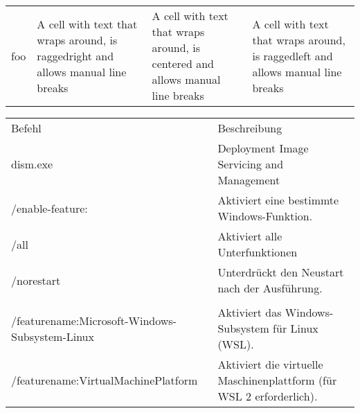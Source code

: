 \documentclass{article}
\begin{document}
\begin{tabular}{| c | L{3cm} | C{3cm} | R{3cm} |}
foo &
A cell with text that wraps around, is raggedright and allows \newline
    manual line breaks &
A cell with text that wraps around, is centered and allows \newline
    manual line breaks &
A cell with text that wraps around, is raggedleft and allows \newline
    manual line breaks \\
\end{tabular}


\begin{table}[]
\begin{tabular}{|L{6cm}|L{7cm}|}
Befehl                                         & Beschreibung                                                         \\
dism.exe                                       & Deployment Image Servicing and Management                            \\
/enable-feature:                               & Aktiviert eine bestimmte Windows-Funktion.                           \\
/all                                           & Aktiviert alle Unterfunktionen                                       \\
/norestart                                     & Unterdrückt den Neustart nach der Ausführung.                        \\
                                               &                                                                      \\
/featurename:Microsoft-Windows-Subsystem-Linux & Aktiviert das Windows-Subsystem für Linux (WSL).                     \\
/featurename:VirtualMachinePlatform            & Aktiviert die virtuelle Maschinenplattform (für WSL 2 erforderlich).
\end{tabular}
\end{table}
\end{document}
